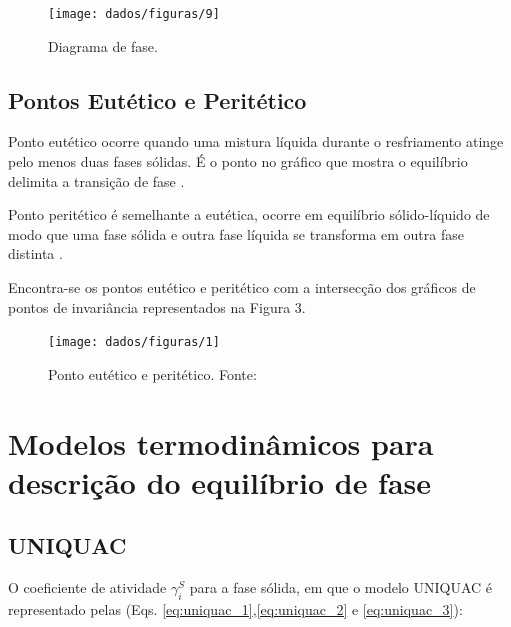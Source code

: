 \begin{figure}[H]
	\centering
	\texttt{[image: dados/figuras/9]}
	\caption[Diagrama de fase]{Diagrama de fase. \cite{Rocha2011}}
	\label{fig:9}
\end{figure}

\subsection{Pontos Eutético e Peritético}
	
\hspace{0.5cm} Ponto eutético ocorre quando uma mistura líquida durante o resfriamento atinge pelo menos duas fases sólidas. É o ponto no gráfico que mostra o equilíbrio delimita a transição de fase \cite{Rocha2011}. 

Ponto peritético é semelhante a eutética, ocorre em equilíbrio sólido-líquido de modo que uma fase sólida e outra fase líquida se transforma em outra fase distinta \cite{Rocha2011}.
	
Encontra-se os pontos eutético e peritético com a intersecção dos gráficos de pontos de invariância representados na Figura 3.
	
\begin{figure}[H]
	\centering
	\texttt{[image: dados/figuras/1]}
	\caption[Ponto eutético e peritético]{Ponto eutético e peritético. Fonte:\cite{Rocha2011}}
	\label{diagrama1}
\end{figure}

\section{Modelos termodinâmicos para descrição do equilíbrio de fase}
	
\subsection{UNIQUAC}
	
	O coeficiente de atividade $\gamma^{S}_{i}$ para a fase sólida, em que o modelo UNIQUAC é representado pelas (Eqs. \ref{eq:uniquac_1},\ref{eq:uniquac_2} e \ref{eq:uniquac_3}):
	
